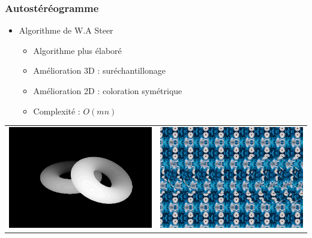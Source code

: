 \documentclass{beamer}
\begin{document}
%
\begin{frame}
\frametitle{Autostéréogramme}
\begin{itemize}[label=$\bullet$]
	\item Algorithme de W.A Steer \cite{wasteer}
	\begin{itemize}[label=$\circ$]
	\item Algorithme plus élaboré
	\item Amélioration 3D : suréchantillonage
	\item Amélioration 2D : coloration symétrique
	\item Complexité : $O(mn)$
	\end{itemize}
\end{itemize}
\begin{tabular}{l|r}
\includegraphics[scale=0.22]{donutdepth.png}
&
\includegraphics[scale=0.22]{donut2.png}
\end{tabular}

\end{frame}
\end{document}

